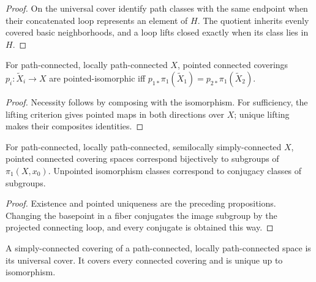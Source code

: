 \begin{proof}
\sketch On the universal cover identify path classes with the same endpoint
when their concatenated loop represents an element of $H$. The quotient
inherits evenly covered basic neighborhoods, and a loop lifts closed exactly
when its class lies in $H$.
\end{proof}

\begin{proposition}
\label{prop:covering-space-isomorphism-criterion}



For path-connected, locally path-connected $X$, pointed connected coverings
$p_i:\widetilde X_i\to X$ are pointed-isomorphic iff
$p_{1*}\pi_1(\widetilde X_1)=p_{2*}\pi_1(\widetilde X_2)$.
\end{proposition}

\begin{proof}
\sketch Necessity follows by composing with the isomorphism. For sufficiency,
the lifting criterion gives pointed maps in both directions over $X$; unique
lifting makes their composites identities.
\end{proof}

\begin{theorem}
\label{thm:covering-space-classification}


For path-connected, locally path-connected, semilocally simply-connected $X$,
pointed connected covering spaces correspond bijectively to subgroups of
$\pi_1(X,x_0)$. Unpointed isomorphism classes correspond to conjugacy classes
of subgroups.
\end{theorem}

\begin{proof}
\sketch Existence and pointed uniqueness are the preceding propositions.
Changing the basepoint in a fiber conjugates the image subgroup by the
projected connecting loop, and every conjugate is obtained this way.
\end{proof}

\begin{definition}
\label{def:universal-cover}


A simply-connected covering of a path-connected, locally path-connected space
is its universal cover. It covers every connected covering and is unique up
to isomorphism.
\end{definition}

